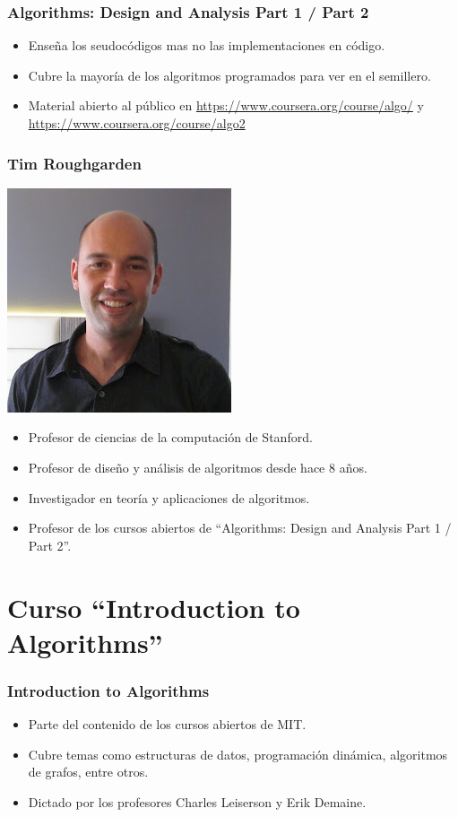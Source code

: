 \documentclass{beamer}
\begin{document}
	\begin{frame}
		\frametitle{Algorithms: Design and Analysis Part 1 / Part 2}
		\begin{itemize}
			\item Enseña los seudocódigos mas no las implementaciones en código.
			\item Cubre la mayoría de los algoritmos programados para ver en el semillero.
			\item Material abierto al público en \url{https://www.coursera.org/course/algo/} y \url{https://www.coursera.org/course/algo2}
		\end{itemize}	
	\end{frame}
	
	\begin{frame}
		\frametitle{Tim Roughgarden}
		\begin{center} \includegraphics[height = 0.25\textheight]{Tim.jpg} \end{center}
		\begin{itemize}
			\item Profesor de ciencias de la computación de Stanford.
			\item Profesor de diseño y análisis de algoritmos desde hace 8 años.
			\item Investigador en teoría y aplicaciones de algoritmos.
			\item Profesor de los cursos abiertos de ``Algorithms: Design and Analysis Part 1 / Part 2''. 
		\end{itemize}
	\end{frame}
	


\section[Curso MIT]{Curso ``Introduction to Algorithms''}
	\begin{frame}
		\frametitle{Introduction to Algorithms}
		\begin{itemize}
			\item Parte del contenido de los cursos abiertos de MIT.
			\item Cubre temas como estructuras de datos, programación dinámica, algoritmos de grafos, entre otros.
			\item Dictado por los profesores Charles Leiserson y Erik Demaine.
		\end{itemize}
	\end{frame}
	
\end{document}
